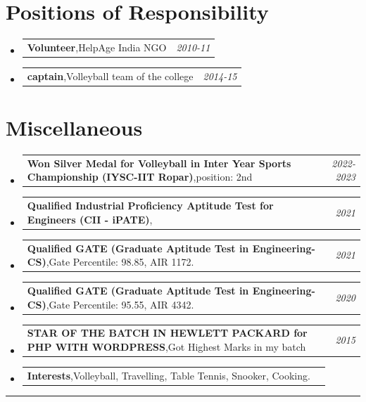 \documentclass[a4paper,11pt]{article}
\makeatletter
\newcommand{\resumePOR}[3]{
\vspace{0.5mm}\item
    \begin{tabular*}{0.97\textwidth}[t]{l@{\extracolsep{\fill}}r}
        \textbf{#1},\hspace{0.3mm}#2 & \textit{\small{#3}} 
    \end{tabular*}
    \vspace{-2mm}
}
\newcommand{\resumeSubHeadingListStart}{\begin{itemize}[leftmargin=*,labelsep=0mm]}
\newcommand{\resumeSubHeadingListEnd}{\end{itemize}\vspace{2mm}}
\makeatother
\begin{document}
\vspace{-1mm}


\section{\color{blue}\textbf{Positions of Responsibility}}
\vspace{-0.4mm}
\resumeSubHeadingListStart
\resumePOR{Volunteer} %
    {HelpAge India NGO} %
    {2010-11} %
\resumePOR{captain} %
    {Volleyball team of the college} %
    {2014-15} %
\resumeSubHeadingListEnd
\vspace{-4mm}


\section{\color{blue}\textbf{Miscellaneous}}
\vspace{-0.1mm}
\resumeSubHeadingListStart
\resumePOR{Won Silver Medal for Volleyball in Inter Year Sports Championship (IYSC-IIT Ropar)} %
    {position: 2nd} %
    {2022-2023} %
    
\resumePOR{Qualified Industrial Proficiency Aptitude Test for Engineers (CII - iPATE)} %
{} %
    {2021} %
\resumePOR{Qualified GATE (Graduate Aptitude Test in Engineering-CS)} %
    {Gate Percentile: 98.85, AIR 1172.} %
    {2021} %
\vspace{-0.1mm}
\resumePOR{Qualified GATE (Graduate Aptitude Test in Engineering-CS)} %
 {Gate Percentile: 95.55, AIR 4342.} %
    {2020} %
\vspace{-0.1mm}
\resumePOR{STAR OF THE BATCH IN HEWLETT PACKARD for PHP WITH WORDPRESS} %
{Got Highest Marks in my batch} %
    {2015} %
\resumePOR{Interests} %
    {Volleyball, Travelling, Table Tennis, Snooker, Cooking.} %
    {} %

    
\vspace{-1.2mm}
\resumeSubHeadingListEnd
\hspace*{-5mm}\rule{1.035\textwidth}{0.1mm}


\end{document}
